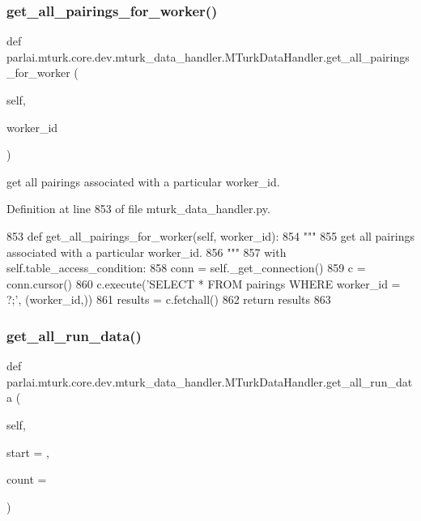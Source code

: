 \subsubsection{\texorpdfstring{get\+\_\+all\+\_\+pairings\+\_\+for\+\_\+worker()}{get\_all\_pairings\_for\_worker()}}
{\footnotesize\ttfamily def parlai.\+mturk.\+core.\+dev.\+mturk\+\_\+data\+\_\+handler.\+M\+Turk\+Data\+Handler.\+get\+\_\+all\+\_\+pairings\+\_\+for\+\_\+worker (\begin{DoxyParamCaption}\item[{}]{self,  }\item[{}]{worker\+\_\+id }\end{DoxyParamCaption})}

\begin{DoxyVerb}get all pairings associated with a particular worker_id.
\end{DoxyVerb}
 

Definition at line 853 of file mturk\+\_\+data\+\_\+handler.\+py.


\begin{DoxyCode}
853     \textcolor{keyword}{def }get\_all\_pairings\_for\_worker(self, worker\_id):
854         \textcolor{stringliteral}{"""}
855 \textcolor{stringliteral}{        get all pairings associated with a particular worker\_id.}
856 \textcolor{stringliteral}{        """}
857         with self.table\_access\_condition:
858             conn = self.\_get\_connection()
859             c = conn.cursor()
860             c.execute(\textcolor{stringliteral}{'SELECT * FROM pairings WHERE worker\_id = ?;'}, (worker\_id,))
861             results = c.fetchall()
862             \textcolor{keywordflow}{return} results
863 
\end{DoxyCode}
\mbox{\label{classparlai_1_1mturk_1_1core_1_1dev_1_1mturk__data__handler_1_1MTurkDataHandler_a23837cfc187beca71c486a2b3000459e}} 
\subsubsection{\texorpdfstring{get\+\_\+all\+\_\+run\+\_\+data()}{get\_all\_run\_data()}}
{\footnotesize\ttfamily def parlai.\+mturk.\+core.\+dev.\+mturk\+\_\+data\+\_\+handler.\+M\+Turk\+Data\+Handler.\+get\+\_\+all\+\_\+run\+\_\+data (\begin{DoxyParamCaption}\item[{}]{self,  }\item[{}]{start = {},  }\item[{}]{count = {} }\end{DoxyParamCaption})}


